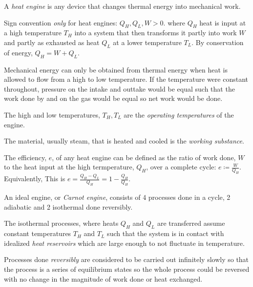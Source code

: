 \begin{definition}
    A \emph{heat engine} is any device that changes thermal energy into mechanical work. 
\end{definition}
\begin{note}
    Sign convention \emph{only} for heat engines: $Q_H, Q_L, W > 0.$ where $Q_H$ heat is input at a high temperature $T_H$ into a system that then transforms it partly into work $W$ and partly as exhausted as heat $Q_L$ at a lower temperature $T_L$. By conservation of energy, $Q_H = W + Q_L$.
\end{note}
\begin{remark}
    Mechanical energy can only be obtained from thermal energy when heat is allowed to flow from a high to low temperature. If the temperature were constant throughout, pressure on the intake and outtake would be equal such that the work done by and on the gas would be equal so net work would be done.
\end{remark}
\begin{definition}
    The high and low temperatures, $T_H, T_L$ are the \emph{operating temperatures} of the engine.
\end{definition}
\begin{definition}
    The material, usually steam, that is heated and cooled is the \emph{working substance}.
\end{definition}
\begin{definition}
    The efficiency, $e$, of any heat engine can be defined as the ratio of work done, $W$ to the heat input at the high termperature, $Q_H$, over a complete cycle: $e \coloneq \frac{W}{Q_H}$. Equivalently, This is $e = \frac{Q_H-Q_L}{Q_H} = 1 - \frac{Q_H}{Q_H}.$
\end{definition}
\begin{definition}
    An ideal engine, or \emph{Carnot engine}, consists of 4 processes done in a cycle, 2 adiabatic and 2 isothermal done reversibly.

    The isothermal processes, where heats $Q_H$ and $Q_L$ are transferred assume constant temperatures $T_H$ and $T_L$ such that the system is in contact with idealized \emph{heat reservoirs} which are large enough to not fluctuate in temperature.
\end{definition}
\begin{definition}
    Processes done \emph{reversibly} are considered to be carried out infinitely slowly so that the process is a series of equilibrium states so the whole process could be reversed with no change in the magnitude of work done or heat exchanged.
\end{definition}
